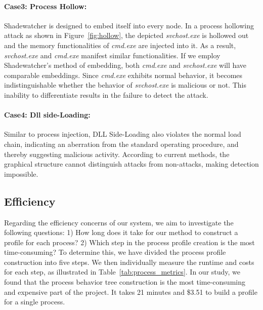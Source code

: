 \paragraph{Case3: Process Hollow:} Shadewatcher\cite{zengy2022shadewatcher} is designed to embed itself into every node. In a process hollowing attack as shown in Figure~\ref{fig:hollow}, the depicted \textit{svchost.exe} is hollowed out and the memory functionalities of \textit{cmd.exe} are injected into it. As a result, \textit{svchost.exe} and \textit{cmd.exe} manifest similar functionalities. If we employ Shadewatcher's method of embedding, both \textit{cmd.exe} and \textit{svchost.exe} will have comparable embeddings. Since \textit{cmd.exe} exhibits normal behavior, it becomes indistinguishable whether the behavior of \textit{svchost.exe} is malicious or not. This inability to differentiate results in the failure to detect the attack.

\paragraph{Case4: Dll side-Loading:} Similar to process injection, DLL Side-Loading also violates the normal load chain, indicating an aberration from the standard operating procedure, and thereby suggesting malicious activity. According to current methods\cite{wang2022threatrace}, the graphical structure cannot distinguish attacks from non-attacks, making detection impossible.




\subsection{Efficiency}
\label{sec-eff}
Regarding the efficiency concerns of our system, we aim to investigate the following questions:
1) How long does it take for our method to construct a profile for each process?
2) Which step in the process profile creation is the most time-consuming?
To determine this, we have divided the process profile construction into five steps. We then individually measure the runtime and costs for each step, as illustrated in Table~\ref{tab:process_metrics}.
In our study, we found that the process behavior tree construction is the most time-consuming and expensive part of the project. It takes 21 minutes and \$3.51 to build a profile for a single process.

